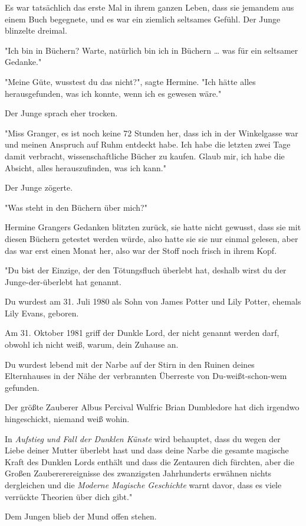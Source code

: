 {Es war tatsächlich das erste Mal in ihrem ganzen Leben, dass sie jemandem aus einem Buch begegnete, und es war ein ziemlich seltsames Gefühl. Der Junge blinzelte dreimal.

"Ich bin in Büchern? Warte, natürlich bin ich in Büchern … was für ein seltsamer Gedanke."

"Meine Güte, wusstest du das nicht?", sagte Hermine. "Ich hätte alles herausgefunden, was ich konnte, wenn ich es gewesen wäre."

Der Junge sprach eher trocken.

"Miss Granger, es ist noch keine 72 Stunden her, dass ich in der Winkelgasse war und meinen Anspruch auf Ruhm entdeckt habe. Ich habe die letzten zwei Tage damit verbracht, wissenschaftliche Bücher zu kaufen. Glaub mir, ich habe die Absicht, alles herauszufinden, was ich kann."

Der Junge zögerte.

"Was steht in den Büchern über mich?"

Hermine Grangers Gedanken blitzten zurück, sie hatte nicht gewusst, dass sie mit diesen Büchern getestet werden würde, also hatte sie sie nur einmal gelesen, aber das war erst einen Monat her, also war der Stoff noch frisch in ihrem Kopf.

"Du bist der Einzige, der den Tötungsfluch überlebt hat, deshalb wirst du der Junge-der-überlebt hat genannt.

Du wurdest am 31. Juli 1980 als Sohn von James Potter und Lily Potter, ehemals Lily Evans, geboren.

Am 31. Oktober 1981 griff der Dunkle Lord, der nicht genannt werden darf, obwohl ich nicht weiß, warum, dein Zuhause an.

Du wurdest lebend mit der Narbe auf der Stirn in den Ruinen deines Elternhauses in der Nähe der verbrannten Überreste von Du-weißt-schon-wem gefunden.

Der größte Zauberer Albus Percival Wulfric Brian Dumbledore hat dich irgendwo hingeschickt, niemand weiß wohin.

In \emph{Aufstieg und Fall der Dunklen Künste} wird behauptet, dass du wegen der Liebe deiner Mutter überlebt hast und dass deine Narbe die gesamte magische Kraft des Dunklen Lords enthält und dass die Zentauren dich fürchten, aber die Großen Zaubererereignisse des zwanzigsten Jahrhunderts erwähnen nichts dergleichen und die \emph{Moderne Magische Geschichte} warnt davor, dass es viele verrückte Theorien über dich gibt."

Dem Jungen blieb der Mund offen stehen.

}
